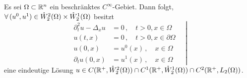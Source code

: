 \begin{kor}
\label{kor:10.14}
Es sei $\Omega \subset \mathbb{R}^n$ ein beschränktes $C^\infty$-Gebiet. Dann folgt, $\forall \, (u^0,u^1) \in \mathring W^2_2(\Omega) \times \mathring W^1_2(\Omega)$ besitzt
\[
	\left.
	\begin{aligned}
		\partial^2_t u - \Delta_x u & = 0 \, , \quad t > 0, x \in \Omega \\
		u(t,x) & = 0 \, , \quad t > 0, x \in \partial \Omega \\
		u(0,x) & = u^0(x) \, , \quad x \in \Omega \\
		\partial_t u(0,x) & =u^1(x) \, , \quad x \in \Omega
	\end{aligned}
	\quad  \right|
\]
eine eindeutige Lösung $u \in C(\mathbb{R}^+,\mathring W^2_2(\Omega))\cap C^1(\mathbb{R}^+,\mathring W^1_2(\Omega))\cap C^2(\mathbb{R}^+,L_2(\Omega))$.
\end{kor}


